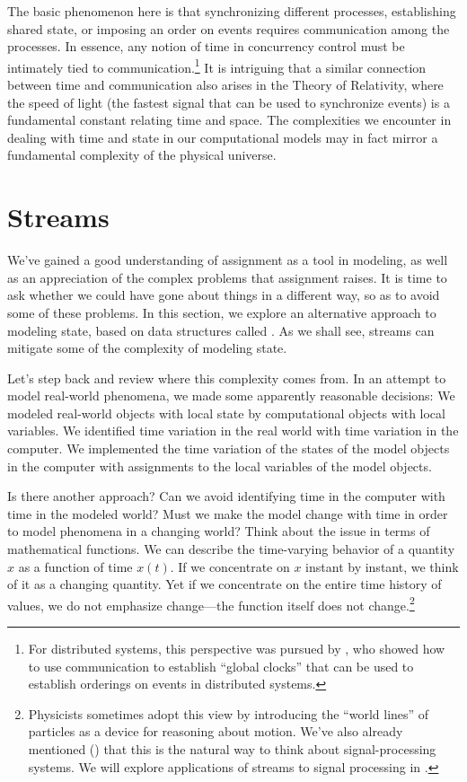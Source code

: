 The basic phenomenon here is that synchronizing different processes,
establishing shared state, or imposing an order on events requires
communication among the processes.  In essence, any notion of time in
concurrency control must be intimately tied to communication.\footnote{For
distributed systems, this perspective was pursued by , who showed
how to use communication to establish ``global clocks'' that can be used to
establish orderings on events in distributed systems.}  It is intriguing that a
similar connection between time and communication also arises in the Theory of
Relativity, where the speed of light (the fastest signal that can be used to
synchronize events) is a fundamental constant relating time and space.  The
complexities we encounter in dealing with time and state in our computational
models may in fact mirror a fundamental complexity of the physical universe.

\section{Streams}
\label{Section 3.5}

We've gained a good understanding of assignment as a tool in modeling, as well
as an appreciation of the complex problems that assignment raises. It is time
to ask whether we could have gone about things in a different way, so as to
avoid some of these problems.  In this section, we explore an alternative
approach to modeling state, based on data structures called .
As we shall see, streams can mitigate some of the complexity of modeling state.

Let's step back and review where this complexity comes from.  In an attempt to
model real-world phenomena, we made some apparently reasonable decisions: We
modeled real-world objects with local state by computational objects with local
variables.  We identified time variation in the real world with time variation
in the computer.  We implemented the time variation of the states of the model
objects in the computer with assignments to the local variables of the model
objects.

Is there another approach?  Can we avoid identifying time in the computer with
time in the modeled world?  Must we make the model change with time in order to
model phenomena in a changing world?  Think about the issue in terms of
mathematical functions.  We can describe the time-varying behavior of a
quantity \( x \) as a function of time \( x(t) \).  If we concentrate on \( x \)
instant by instant, we think of it as a changing quantity.  Yet if we
concentrate on the entire time history of values, we do not emphasize
change---the function itself does not change.\footnote{Physicists sometimes
adopt this view by introducing the ``world lines'' of particles as a device for
reasoning about motion.  We've also already mentioned ()
that this is the natural way to think about signal-processing systems.  We will
explore applications of streams to signal processing in .}

